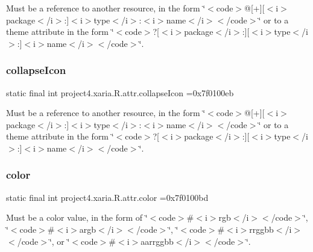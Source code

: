 Must be a reference to another resource, in the form \char`\"{}$<$code$>$@\mbox{[}+\mbox{]}\mbox{[}$<$i$>$package$<$/i$>$\+:\mbox{]}$<$i$>$type$<$/i$>$\+:$<$i$>$name$<$/i$>$$<$/code$>$\char`\"{} or to a theme attribute in the form \char`\"{}$<$code$>$?\mbox{[}$<$i$>$package$<$/i$>$\+:\mbox{]}\mbox{[}$<$i$>$type$<$/i$>$\+:\mbox{]}$<$i$>$name$<$/i$>$$<$/code$>$\char`\"{}. \mbox{\label{classproject4_1_1xaria_1_1R_1_1attr_aa0bee61975f350438a31de737ca671d3}} 
\subsubsection{\texorpdfstring{collapse\+Icon}{collapseIcon}}
{\footnotesize\ttfamily static final int project4.\+xaria.\+R.\+attr.\+collapse\+Icon =0x7f0100eb\hspace{0.3cm}{\ttfamily [static]}}

Must be a reference to another resource, in the form \char`\"{}$<$code$>$@\mbox{[}+\mbox{]}\mbox{[}$<$i$>$package$<$/i$>$\+:\mbox{]}$<$i$>$type$<$/i$>$\+:$<$i$>$name$<$/i$>$$<$/code$>$\char`\"{} or to a theme attribute in the form \char`\"{}$<$code$>$?\mbox{[}$<$i$>$package$<$/i$>$\+:\mbox{]}\mbox{[}$<$i$>$type$<$/i$>$\+:\mbox{]}$<$i$>$name$<$/i$>$$<$/code$>$\char`\"{}. \mbox{\label{classproject4_1_1xaria_1_1R_1_1attr_adee954827e4c5b2937083c916967b725}} 
\subsubsection{\texorpdfstring{color}{color}}
{\footnotesize\ttfamily static final int project4.\+xaria.\+R.\+attr.\+color =0x7f0100bd\hspace{0.3cm}{\ttfamily [static]}}

Must be a color value, in the form of \char`\"{}$<$code$>$\#$<$i$>$rgb$<$/i$>$$<$/code$>$\char`\"{}, \char`\"{}$<$code$>$\#$<$i$>$argb$<$/i$>$$<$/code$>$\char`\"{}, \char`\"{}$<$code$>$\#$<$i$>$rrggbb$<$/i$>$$<$/code$>$\char`\"{}, or \char`\"{}$<$code$>$\#$<$i$>$aarrggbb$<$/i$>$$<$/code$>$\char`\"{}. 

